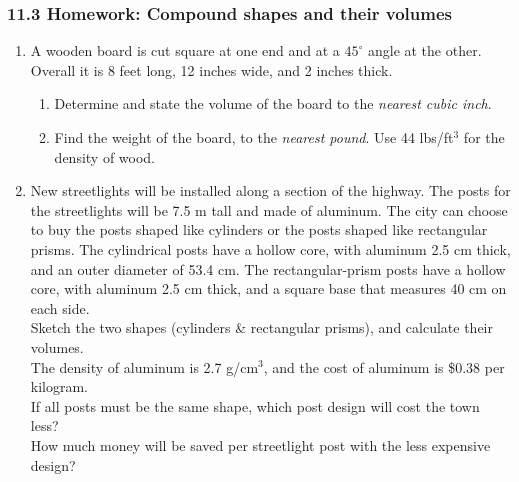 \documentclass[12pt, twoside]{article}
\begin{document}
\subsubsection*{11.3 Homework: Compound shapes and their volumes}
 \begin{enumerate}

   \item A wooden board is cut square at one end and at a $45^\circ$ angle at the other. Overall it is 8 feet long, 12 inches wide, and 2 inches thick.\\[0.5cm]
    \vspace{0.5cm}

   \begin{enumerate}
     \item Determine and state the volume of the board to the \emph{nearest  cubic inch}. \vspace{9cm}
     \item Find the weight of the board, to the \emph{nearest pound}. Use 44 lbs/ft$^3$ for the density of wood.
   \end{enumerate}

\newpage
   \item New streetlights will be installed along a section of the highway. The posts for the streetlights will be 7.5 m tall and made of aluminum. The city can choose to buy the posts shaped like cylinders or the posts shaped like rectangular prisms. The cylindrical posts have a hollow core, with aluminum 2.5 cm thick, and an outer diameter of 53.4 cm. The rectangular-prism posts have a hollow core, with aluminum 2.5 cm thick, and a square base that measures 40 cm on each side.\\[0.25cm]
   Sketch the two shapes (cylinders \& rectangular prisms), and calculate their volumes.\\[8cm]
   The density of aluminum is 2.7 g/cm$^3$, and the cost of aluminum is \$0.38 per kilogram.\\[0.25cm]
   If all posts must be the same shape, which post design will cost the town less?\\[5cm]

   How much money will be saved per streetlight post with the less expensive design?

\end{enumerate}
\end{document}
